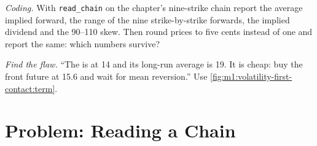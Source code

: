 \begin{exercise}[$\star\star\star$]\label{exo:m1:volatility-first-contact:7}
\emph{Coding.} With \texttt{read\_chain} on the chapter's nine-strike chain
report the average implied forward, the range of the nine strike-by-strike
forwards, the implied dividend and the 90--110 skew. Then round prices to
five cents instead of one and report the same: which numbers survive?
\end{exercise}

\begin{exercise}[$\star\star\star$]\label{exo:m1:volatility-first-contact:8}
\emph{Find the flaw.} ``The  is at 14 and its long-run average
is 19. It is cheap: buy the front future at 15.6 and wait for mean
reversion.'' Use \cref{fig:m1:volatility-first-contact:term}.
\end{exercise}

\section{Problem: Reading a Chain}

